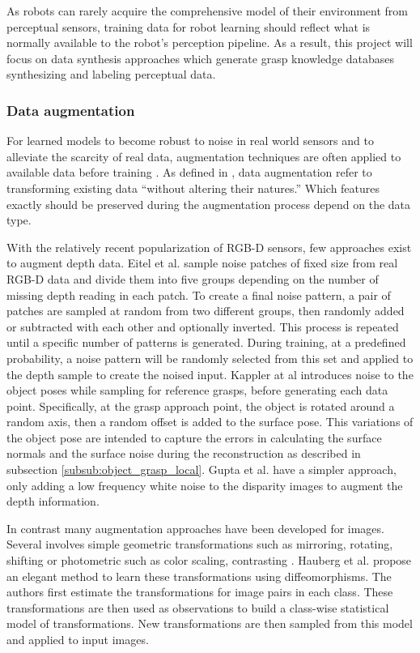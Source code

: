 As robots can rarely acquire the comprehensive model of their environment from perceptual sensors, training data for
robot learning should reflect what is normally available to the robot's perception pipeline. As a result, this project
will focus on data synthesis approaches which generate grasp knowledge databases synthesizing and labeling perceptual
data.

\subsubsection{Data augmentation}

For learned models to become robust to noise in real world sensors and to alleviate the scarcity of real data,
augmentation techniques are often applied to available data before training
\cite{Eitel2015,Kappler2015,Gupta2014RGBDFeatures}. As defined in \cite{Gu2018}, data augmentation refer to transforming
existing data ``without altering their natures.'' Which features exactly should be preserved during the augmentation
process depend on the data type.

With the relatively recent popularization of RGB-D sensors, few approaches exist to augment depth data. Eitel et al.
\cite{Eitel2015} sample noise patches of fixed size from real RGB-D data and divide them into five groups depending on
the number of missing depth reading in each patch. To create a final noise pattern, a pair of patches are sampled at
random from two different groups, then randomly added or subtracted with each other and optionally inverted. This
process is repeated until a specific number of patterns is generated. During training, at a predefined probability,
a noise pattern will be randomly selected from this set and applied to the depth sample to create the noised input.
Kappler at al \cite{Kappler2015} introduces noise to the object poses while sampling for reference grasps, before
generating each data point. Specifically, at the grasp approach point, the object is rotated around a random axis, then
a random offset is added to the surface pose. This variations of the object pose are intended to capture the errors in
calculating the surface normals and the surface noise during the reconstruction as described in subsection
\ref{subsub:object_grasp_local}. Gupta et al. \cite{Gupta2014RGBDFeatures} have a simpler approach, only adding a low
frequency white noise to the disparity images to augment the depth information.

In contrast many augmentation approaches have been developed for images. Several involves simple geometric
transformations such as mirroring, rotating, shifting \cite{Gu2018} or photometric such as color scaling, contrasting
\cite{Eigen2015}. Hauberg et al. \cite{Hauberg2016Diffeomorphism} propose an elegant method to learn these
transformations using diffeomorphisms. The authors first estimate the transformations for image pairs in each class.
These transformations are then used as observations to build a class-wise statistical model of transformations.
New transformations are then sampled from this model and applied to input images.

